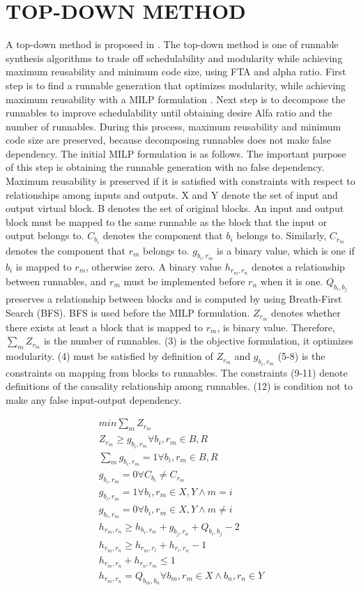 \documentclass[conference,compsoc]{IEEEtran}
\begin{document}
\section{TOP-DOWN METHOD}
 A top-down method is proposed in \cite{Deng:2015:MSF:2735960.2735972}.
The top-down method is one of runnable synthesis algorithms to trade off schedulability and modularity while achieving maximum reusability and minimum code size, using FTA and alpha ratio. 
First step is to find a runnable generation that optimizes modularity, while achieving maximum reusability with a MILP formulation \cite{6871195}.
Next step is to decompose the runnables to improve schedulability until obtaining desire Alfa ratio and the number of runnables.
During this process, maximum reusability and minimum code size are preserved, because decomposing runnables does not make false dependency.
 The initial MILP formulation is as follows.
The important purpose of this step is obtaining the runnable generation with no false dependency.
Maximum reusability is preserved if it is satisfied with constraints with respect to relationships among inputs and outputs.
X and Y denote the set of input and output virtual block.
B denotes the set of original blocks.
An input and output block must be mapped to the same runnable as the block that the input or output belongs to.
$C_{b_i}$ denotes the component that $b_i$ belongs to.
Similarly, $C_{r_m}$ denotes the component that $r_m$ belongs to.
$g_{b_i,r_m}$ is a binary value, which is one if $b_i$ is mapped to $r_m$, otherwise zero.
A binary value $h_{r_m,r_n}$ denotes a relationship between runnables, and $r_m$ must be implemented before $r_n$ when it is one.
$Q_{b_i,b_j}$ preserves a relationship between blocks and is computed by using Breath-First Search (BFS).
BFS is used before the MILP formulation.
$Z_{r_m}$ denotes whether there exists at least a block that is mapped to $r_m$, is binary value.
Therefore, $\sum_m Z_{r_m}$ is the number of runnables.
(3) is the objective formulation, it optimizes modularity.
(4) must be satisfied by definition of $Z_{r_m}$ and $g_{b_i,r_m}$
(5-8) is the constraints on mapping from blocks to runnables.
The constraints (9-11) denote definitions of the causality relationship among runnables.
(12) is condition not to make any false input-output dependency. 

\begin{eqnarray}
 min \sum_{m} Z_{r_m} \\
 Z_{r_m} \geq g_{b_i,r_m} \forall b_i,r_m \in B,R \\
 \sum_m g_{b_i,r_m} = 1 \forall b_i,r_m \in B,R \\
 g_{b_i,r_m} = 0 \forall C_{b_i} \neq C_{r_m} \\
 g_{b_i,r_m} = 1 \forall b_i,r_m \in X,Y \wedge m = i \\
 g_{b_i,r_m} = 0 \forall b_i,r_m \in X,Y \wedge m \neq i \\
 h_{r_m,r_n} \geq h_{b_i,r_m} + g_{b_j,r_n} + Q_{b_i,b_j} - 2 \\
 h_{r_m,r_n} \geq h_{r_m,r_l} + h_{r_l,r_n} - 1 \\
 h_{r_m,r_n} + h_{r_n,r_m} \leq 1 \\
 h_{r_m,r_n} = Q_{b_m,b_n} \forall b_m,r_m \in X \wedge b_n,r_n \in Y
\end{eqnarray}
\end{document}
